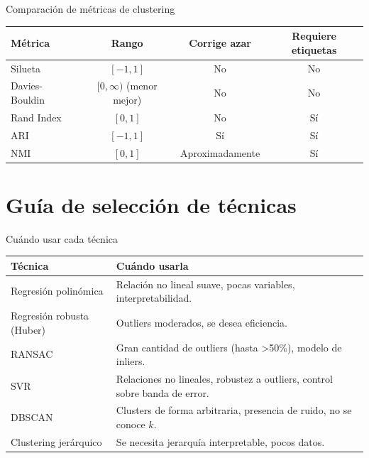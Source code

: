 \documentclass[aspectratio=169, 10pt, xcolor=table]{beamer}
\begin{document}
\begin{frame}{Comparación de métricas de clustering}
    \begin{table}
        \centering
        \begin{tabular}{l|c|c|c}
            \toprule
            \textbf{Métrica} & \textbf{Rango} & \textbf{Corrige azar} & \textbf{Requiere etiquetas} \\
            \midrule
            Silueta & $[-1,1]$ & No & No \\
            Davies-Bouldin & $[0,\infty)$ (menor mejor) & No & No \\
            Rand Index & $[0,1]$ & No & Sí \\
            ARI & $[-1,1]$ & Sí & Sí \\
            NMI & $[0,1]$ & Aproximadamente & Sí \\
            \bottomrule
        \end{tabular}
    \end{table}
\end{frame}

\section{Guía de selección de técnicas}

\begin{frame}{Cuándo usar cada técnica}
    \begin{table}
        \centering
        \begin{tabular}{p{4cm}|p{6cm}}
            \toprule
            \textbf{Técnica} & \textbf{Cuándo usarla} \\
            \midrule
            Regresión polinómica & Relación no lineal suave, pocas variables, interpretabilidad. \\
            Regresión robusta (Huber) & Outliers moderados, se desea eficiencia. \\
            RANSAC & Gran cantidad de outliers (hasta >50\%), modelo de inliers. \\
            SVR & Relaciones no lineales, robustez a outliers, control sobre banda de error. \\
            DBSCAN & Clusters de forma arbitraria, presencia de ruido, no se conoce $k$. \\
            Clustering jerárquico & Se necesita jerarquía interpretable, pocos datos. \\
            \bottomrule
        \end{tabular}
    \end{table}
\end{frame}
\end{document}
